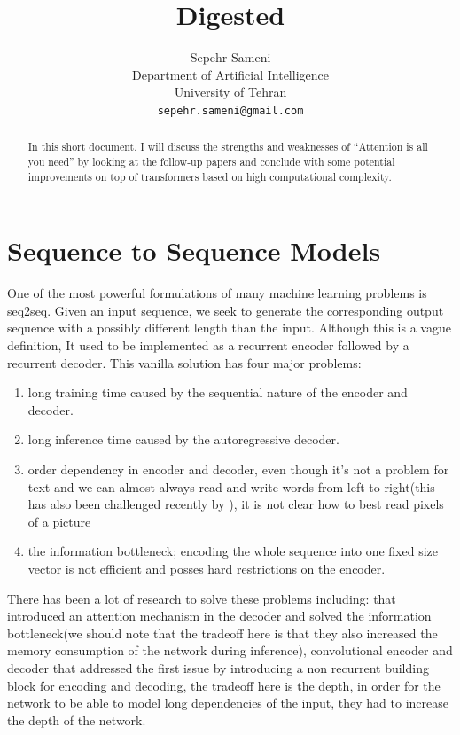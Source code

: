 \documentclass{article}
\title{\quotes{Attention Is All You Need} Digested}
\author{
  Sepehr Sameni\\
  Department of Artificial Intelligence\\
  University of Tehran\\
  \texttt{sepehr.sameni@gmail.com} \\
}
\newcommand{\quotes}[1]{``#1''}
\begin{document}
\maketitle

\begin{abstract}
  In this short document, I will discuss the strengths and weaknesses of \quotes{Attention is all you need}\citep{1706.03762} by looking at the follow-up papers and conclude with some potential improvements on top of transformers based on high computational complexity.
\end{abstract}

\section{Sequence to Sequence Models}
One of the most powerful formulations of many machine learning problems is seq2seq. Given an input sequence, we seek to generate the corresponding output sequence with a possibly different length than the input. Although this is a vague definition, It used to be implemented as a recurrent encoder followed by a recurrent decoder\citep{1409.3215}. This vanilla solution has four major problems:

\begin{enumerate}
  \item long training time caused by the sequential nature of the encoder and decoder.
  \item long inference time caused by the autoregressive decoder.
  \item order dependency in encoder and decoder, even though it’s not a problem for text and we can almost always read and write words from left to right(this has also been challenged recently by \citep{1808.07910}), it is not clear how to best read pixels of a picture\citep{1712.09763}
  \item the information bottleneck; encoding the whole sequence into one fixed size vector is not efficient and posses hard restrictions on the encoder.
\end{enumerate}

There has been a lot of research to solve these problems including: \citep{1409.0473} that introduced an attention mechanism in the decoder and solved the information bottleneck(we should note that the tradeoff here is that they also increased the memory consumption of the network during inference), convolutional encoder and decoder\citep{1705.03122} that addressed the first issue by introducing a non recurrent building block for encoding and decoding, the tradeoff here is the depth, in order for the network to be able to model long dependencies of the input, they had to increase the depth of the network.
\end{document}
